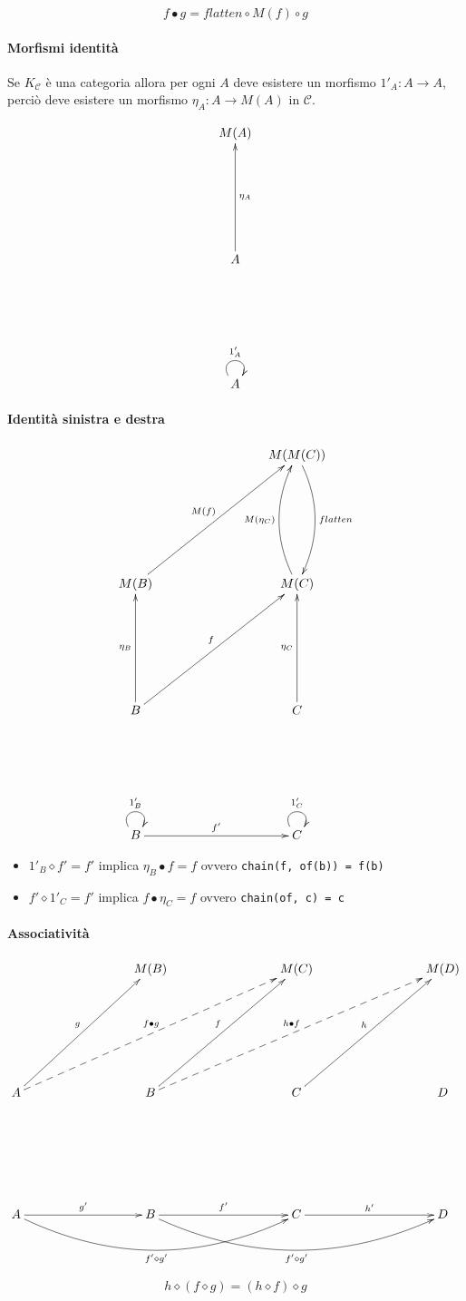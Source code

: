 \documentclass[12pt]{article}
\begin{document}
$$
f \bullet g = flatten \circ M(f) \circ g
$$

\paragraph{Morfismi identità}

Se $K_{\mathcal{C}}$ è una categoria allora per ogni $A$ deve esistere un morfismo $1'_A: A \rightarrow A$,
perciò deve esistere un morfismo $\eta_A: A \rightarrow M(A)$ in $\mathcal{C}$.

\[
\xymatrixrowsep{3cm}
\xymatrixcolsep{3cm}
\xymatrix{
  M(A) \\
  A \ar[u]_{\eta_A} \\
  A \ar@(ul,ur)^{1'_A}
}
\]

\paragraph{Identità sinistra e destra}

\[
\xymatrixrowsep{3cm}
\xymatrixcolsep{3cm}
\xymatrix{
  & M(M(C)) \ar@/_-0.5cm/[d]^{flatten} \\
  M(B) \ar[ur]^{M(f)} & M(C) \ar@/_-0.5cm/[u]^{M(\eta_C)} \\
  B \ar[u]^{\eta_B} \ar[ur]^f & C \ar[u]^{\eta_C} \\
  B \ar@(ul,ur)^{1'_B} \ar[r]^{f'} & C \ar@(ul,ur)^{1'_C}
}
\]

\begin{itemize}
  \item $1'_B \diamond f' = f'$ implica $\eta_B \bullet f = f$ ovvero \texttt{chain(f, of(b)) = f(b)}
  \item $f' \diamond 1'_C = f'$ implica $f \bullet \eta_C = f$ ovvero \texttt{chain(of, c) = c}
\end{itemize}

\paragraph{Associatività}

\[
\xymatrixrowsep{3cm}
\xymatrixcolsep{3cm}
\xymatrix{
  & M(B) & M(C) & M(D) \\
  A \ar[ur]^g \ar@{-->}[urr]^{f \bullet g} & B \ar[ur]^f \ar@{-->}[urr]^{h \bullet f} & C \ar[ur]^h & D \\
  A \ar[r]^{g'} \ar@/_1cm/[rr]_{f' \diamond g'} & B \ar[r]^{f'} \ar@/_1cm/[rr]_{f' \diamond g'} & C \ar[r]^{h'} & D
}
\]

$$
h \diamond (f \diamond g) = (h \diamond f) \diamond g
$$
\end{document}
